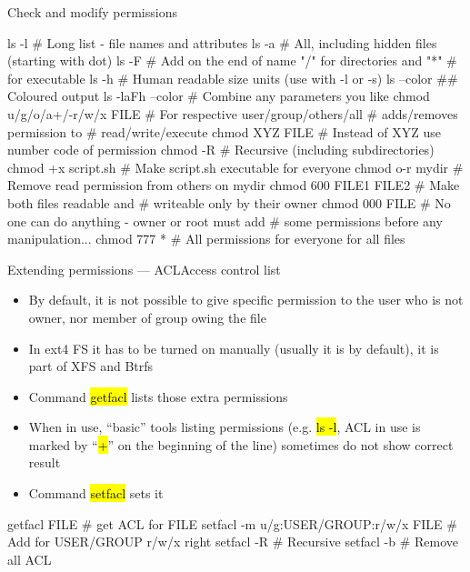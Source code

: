 \documentclass[compress, ucs, xelatex, 11pt, xcolor=svgnames,
  hyperref={
    bookmarks=true,
    unicode=true,
    colorlinks=true,
    pdftitle={Linux, command line and MetaCentrum},
    plainpages=false,
    pdfauthor={Vojtech Zeisek},
    pdfsubject={Course about use of Linux command line, writing shell scripts and using MetaCentrum of CESNET},
    pdfcreator={XeLaTeX, http://www.xelatex.org/},
    pdfkeywords={Linux, GNU, BASH, shell, command line, MetaCentrum},
    linkcolor=Sienna,
    anchorcolor=black,
    citecolor=green,
    filecolor=magenta,
    menucolor=Sienna,
    urlcolor=cyan,
    pdftex},
  url={hyphens, lowtilde} %
  ]{beamer}
\renewcommand{\texttt}[1]{\hl{\ttfamily #1}}
\begin{document}
\begin{frame}[fragile]{Check and modify permissions}
  \begin{bashcode}
    ls -l # Long list - file names and attributes
    ls -a # All, including hidden files (starting with dot)
    ls -F # Add on the end of name "/" for directories and "*"
          # for executable
    ls -h # Human readable size units (use with -l or -s)
    ls --color ## Coloured output
    ls -laFh --color # Combine any parameters you like
    chmod u/g/o/a+/-r/w/x FILE # For respective user/group/others/all
                               # adds/removes permission to
                               # read/write/execute
    chmod XYZ FILE # Instead of XYZ use number code of permission
    chmod -R # Recursive (including subdirectories)
    chmod +x script.sh # Make script.sh executable for everyone
    chmod o-r mydir # Remove read permission from others on mydir
    chmod 600 FILE1 FILE2 # Make both files readable and
                          # writeable only by their owner
    chmod 000 FILE # No one can do anything - owner or root must add
                   # some permissions before any manipulation...
    chmod 777 * # All permissions for everyone for all files
  \end{bashcode}
\end{frame}

\begin{frame}[fragile, label=acl]{Extending permissions --- ACL}{Access control list}
\begin{itemize}
  \item By default, it is not possible to give specific permission to the user who is not owner, nor member of group owing the file
  \item In ext4 FS it has to be turned on manually (usually it is by default), it is part of XFS and Btrfs
  \item Command \texttt{getfacl} lists those extra permissions
  \item When in use, ``basic'' tools listing permissions (e.g. \texttt{ls -l}, ACL in use is marked by ``\texttt{+}'' on the beginning of the line) sometimes do not show correct result
  \item Command \texttt{setfacl} sets it
\end{itemize}
  \begin{bashcode}
    getfacl FILE # get ACL for FILE
    setfacl -m u/g:USER/GROUP:r/w/x FILE # Add for USER/GROUP r/w/x right
    setfacl -R # Recursive
    setfacl -b # Remove all ACL
  \end{bashcode}
\end{frame}
\end{document}
